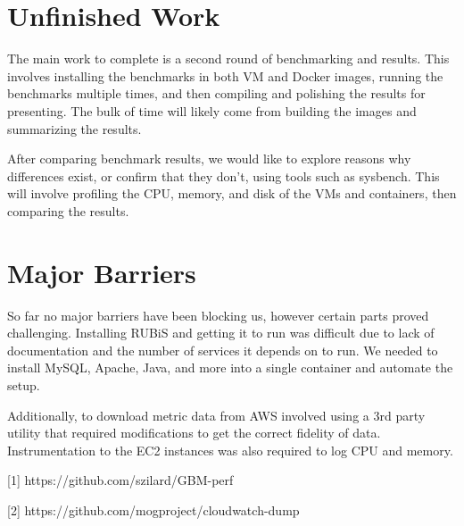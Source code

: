 \documentclass[11pt]{article}
\begin{document}
\section{Unfinished Work}

The main work to complete is a second round of benchmarking and results. This involves installing the benchmarks in both VM and Docker images, running the benchmarks multiple times, and then compiling and polishing the results for presenting. The bulk of time will likely come from building the images and summarizing the results.

After comparing benchmark results, we would like to explore reasons why differences exist, or confirm that they don't, using tools such as sysbench. This will involve profiling the CPU, memory, and disk of the VMs and containers, then comparing the results.

\section{Major Barriers}

So far no major barriers have been blocking us, however certain parts proved challenging. Installing RUBiS and getting it to run was difficult due to lack of documentation and the number of services it depends on to run. We needed to install MySQL, Apache, Java, and more into a single container and automate the setup.

Additionally, to download metric data from AWS involved using a 3rd party utility that required modifications to get the correct fidelity of data. Instrumentation to the EC2 instances was also required to log CPU and memory.

\hspace{16pt}

[1] https://github.com/szilard/GBM-perf

[2] https://github.com/mogproject/cloudwatch-dump
\end{document}
